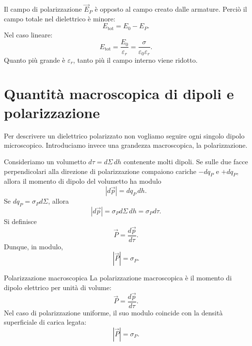 \documentclass[a4paper]{article}
\begin{document}
Il campo di polarizzazione \(\vec{E}_P\) è opposto al campo creato dalle armature. Perciò il campo totale nel dielettrico è minore:
\[
    E_{\mathrm{tot}}=E_0-E_P.
\]
Nel caso lineare:
\[
    E_{\mathrm{tot}}=\frac{E_0}{\varepsilon_r}=\frac{\sigma}{\varepsilon_0\varepsilon_r}.
\]
Quanto più grande è \(\varepsilon_r\), tanto più il campo interno viene ridotto.

\section{Quantità macroscopica di dipoli e polarizzazione}

Per descrivere un dielettrico polarizzato non vogliamo seguire ogni singolo dipolo microscopico. Introduciamo invece una grandezza macroscopica, la polarizzazione.

Consideriamo un volumetto \(d\tau=d\Sigma\,dh\) contenente molti dipoli. Se sulle due facce perpendicolari alla direzione di polarizzazione compaiono cariche \(-dq_P\) e \(+dq_P\), allora il momento di dipolo del volumetto ha modulo
\[
    |d\vec{p}|=dq_P\,dh.
\]
Se \(dq_P=\sigma_Pd\Sigma\), allora
\[
    |d\vec{p}|=\sigma_Pd\Sigma\,dh=\sigma_Pd\tau.
\]
Si definisce
\[
    \vec{P}=\frac{d\vec{p}}{d\tau}.
\]
Dunque, in modulo,
\[
    |\vec{P}|=\sigma_P.
\]

\begin{snippetdefinition}{Polarizzazione macroscopica}
    La polarizzazione macroscopica è il momento di dipolo elettrico per unità di volume:
    \[
        \vec{P}=\frac{d\vec{p}}{d\tau}.
    \]
    Nel caso di polarizzazione uniforme, il suo modulo coincide con la densità superficiale di carica legata:
    \[
        |\vec{P}|=\sigma_P.
    \]
\end{snippetdefinition}

\begin{center}
\end{center}
\end{document}
